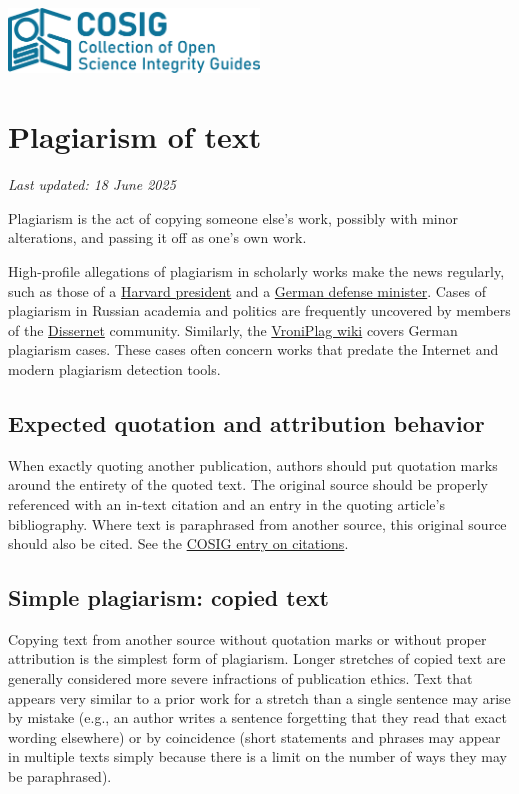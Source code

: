 \documentclass[letterpaper, 12pt]{article}
\begin{document}
\flushleft
\includegraphics[width=0.5\textwidth]{img/home/241017_final_logo_mockup.png}

\section*{Plagiarism of text}
\textit{Last updated: 18 June 2025}

Plagiarism is the act of copying someone else's work, possibly with minor alterations, and passing it off as one's own work.

High-profile allegations of plagiarism in scholarly works make the news regularly, such as those of a \href{https://www.theguardian.com/education/2024/jan/06/harvard-claudine-gay-plagiarism}{Harvard president} and a \href{https://www.bbc.com/news/world-europe-12504347}{German defense minister}. Cases of plagiarism in Russian academia and politics are frequently uncovered by members of the \href{https://dissernet.org/}{Dissernet} community. Similarly, the \href{https://vroniplag.fandom.com/de/wiki/Home}{VroniPlag wiki} covers German plagiarism cases. These cases often concern works that predate the Internet and modern plagiarism detection tools.

\subsection*{Expected quotation and attribution behavior}

When exactly quoting another publication, authors should put quotation marks around the entirety of the quoted text. The original source should be properly referenced with an in-text citation and an entry in the quoting article's bibliography. Where text is paraphrased from another source, this original source should also be cited. See the \href{https://osf.io/5vknq}{COSIG entry on citations}.

\subsection*{Simple plagiarism: copied text}

Copying text from another source without quotation marks or without proper attribution is the simplest form of plagiarism. Longer stretches of copied text are generally considered more severe infractions of publication ethics. Text that appears very similar to a prior work for a stretch than a single sentence may arise by mistake (e.g., an author writes a sentence forgetting that they read that exact wording elsewhere) or by coincidence (short statements and phrases may appear in multiple texts simply because there is a limit on the number of ways they may be paraphrased).
\end{document}
